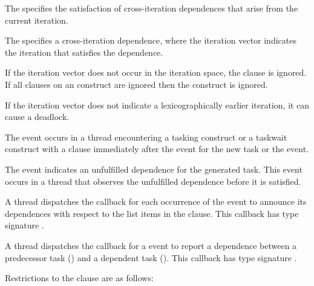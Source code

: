 The   specifies the satisfaction of
cross-iteration dependences that arise from the current iteration.

The   specifies a cross-iteration dependence,
where the iteration vector  indicates the iteration that satisfies
the dependence.

If the iteration vector  does not occur in the iteration space,
the  clause is ignored.  If all  clauses on an
 construct are ignored then the construct is ignored.

\begin{note}
If the iteration vector  does not indicate a lexicographically earlier iteration, it can cause a deadlock.
\end{note}

\events

The  event occurs in a thread encountering a
tasking construct or a taskwait construct with a  clause immediately after 
the  event for the new task or the  event.

The  event indicates an unfulfilled dependence for the generated task.
This event occurs in a thread that observes the unfulfilled dependence before it is satisfied.

\tools

A thread dispatches the  callback
for each occurrence of the  event to
announce its dependences with respect to the list items in the  clause.
This callback has type signature
.

A thread dispatches the 
callback for a  event to report a
dependence between a predecessor task  () and a dependent task
().  This callback has type signature
.

\restrictions
Restrictions to the  clause are as follows:

